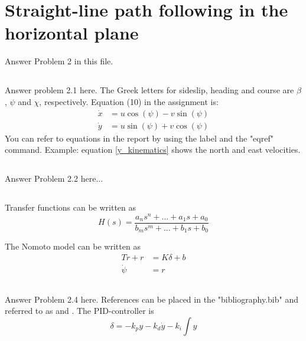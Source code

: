 \section{Straight-line path following in the horizontal plane}
Answer Problem 2 in this file.
\subsection{}
Answer problem 2.1 here. The Greek letters for sideslip, heading and course are $\beta$, $\psi$ and $\chi$, respectively. Equation (10) in the assignment is:
\begin{equation}
\label{y_kinematics}
	\begin{aligned}
		\dot{x} &= u \cos (\psi) -v \sin (\psi) \\
		\dot{y} &= u \sin (\psi) + v \cos (\psi)
	\end{aligned}
\end{equation}
You can refer to equations in the report by using the label and the "eqref" command. Example: equation \eqref{y_kinematics} shows the north and east velocities.

\subsection{}
Answer Problem 2.2 here...

\subsection{}
Transfer functions can be written as
\begin{equation}
	H(s) = \frac{a_n s^n + ... + a_1 s + a_0}{b_m s^m + ... + b_1 s + b_0}
\end{equation}

The Nomoto model can be written as
\begin{equation}
\label{eq:nomoto}
	\begin{aligned}
		T \dot{r} + r &= K \delta + b \\
		\dot{\psi} &= r
	\end{aligned}
\end{equation}

\subsection{}
Answer Problem 2.4 here.  References can be placed in the "bibliography.bib" and referred to as \cite{Fossen2011} and \cite{Fjellstad1994857}. The PID-controller is
\begin{equation}
	\delta = -k_p y - k_d \dot{y} - k_i \int y
\end{equation}
